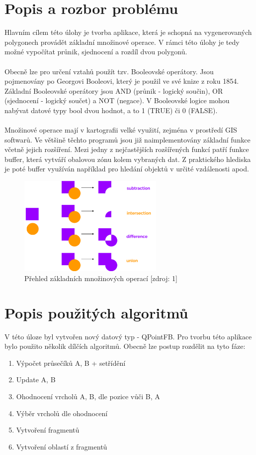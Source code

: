 \documentclass[a4paper, 12pt]{article}
\begin{document}
\section{Popis a rozbor problému}
Hlavním cílem této úlohy je tvorba aplikace, která je schopná na vygenerovaných polygonech provádět základní množinové operace. V rámci této úlohy je tedy možné vypočítat průnik, sjednocení a rozdíl dvou polygonů.\\
\\
Obecně lze pro určení vztahů použít tzv. Booleovské operátory. Jsou pojmenovány po Georgovi Booleovi, který je použil ve své knize z roku 1854. Základní Booleovské operátory jsou AND (průnik - logický součin), OR (sjednocení - logický součet) a NOT (negace). V Booleovské logice mohou nabývat datové typy bool dvou hodnot, a to 1 (TRUE) či 0 (FALSE). \\
\\
Množinové operace mají v kartografii velké využití, zejména v prostředí GIS softwarů. Ve většině těchto programů jsou již naimplementovány základní funkce včetně jejich rozšíření. Mezi jedny z nejčastějších rozšířených funkcí patří funkce buffer, která vytváří obalovou zónu kolem vybraných dat. Z praktického hlediska je poté buffer využíván například pro hledání objektů v určité vzdálenosti apod.

\begin{figure}[h!]
	\centering
	\includegraphics[width=7cm]{pictures/operace.png}
	\caption{Přehled základních množinových operací [zdroj: 1]}
\end{figure}

\section{Popis použitých algoritmů}
V této úloze byl vytvořen nový datový typ - QPointFB. Pro tvorbu této aplikace bylo použito několik dílčích algoritmů. Obecně lze postup rozdělit na tyto fáze:

\begin{enumerate}
\item Výpočet průsečíků A, B + setřídění
\item Update A, B
\item Ohodnocení vrcholů A, B, dle pozice vůči B, A
\item Výběr vrcholů dle ohodnocení
\item Vytvoření fragmentů
\item Vytvoření oblastí z fragmentů
\end{enumerate}
\end{document}
